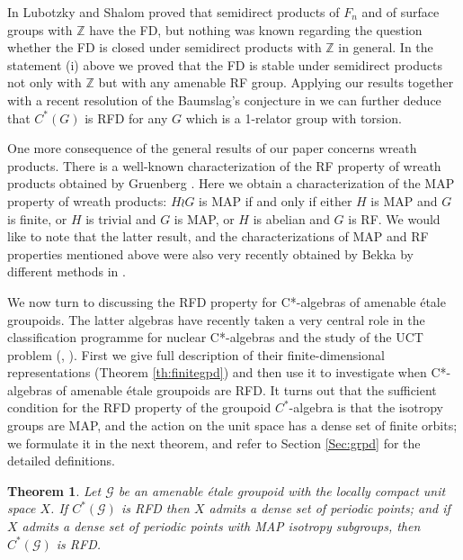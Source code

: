 \documentclass[11 pt, leqno, hidelinks]{amsart}%
\theoremstyle{plain}
\newtheorem{thmx}{Theorem}
\numberwithin{equation}{section}
\newcommand{\Z}{\mathbb{Z}}
\newcommand{\GG}{\mathcal{G}}
\begin{document}
In \cite[Th. 2.8]{LubotzkyShalom} Lubotzky and Shalom proved that semidirect products of $F_n$ and of surface groups with $\Z$ have the FD, but nothing was known regarding the question whether the FD is closed under semidirect products  with $\Z$ in general. In  the statement (i) above we proved that the FD is stable under   semidirect products  not only with $\Z$ but with any amenable RF group. Applying our results together with a recent resolution of the Baumslag's conjecture in \cite{KL} we can further deduce that $C^*(G)$ is RFD for any $G$ which is a 1-relator group with torsion.



One more  consequence  of the general results of our paper concerns wreath products. There is a well-known characterization of the RF property of wreath products  obtained by Gruenberg \cite{Grunberg}.
Here we obtain a characterization of the MAP property of wreath products:  $H \wr G$ is MAP if and only if either $H$ is MAP and $G$ is finite, or $H$ is trivial and $G$ is MAP,   or $H$ is abelian and $G$ is RF. We would like to note that the latter result, and  the characterizations of MAP and RF properties mentioned above  were also very recently obtained by Bekka by different methods in \cite{BekkaPreprint}.%

\medskip

We now turn to discussing the RFD property for C*-algebras of amenable \'etale groupoids.
The latter algebras have recently taken a very central role in the classification programme for nuclear C*-algebras and the study of the UCT problem (\cite{Re}, \cite{BaL}). First we give  full description of their finite-dimensional representations (Theorem \ref{th:finitegpd}) and then use it to investigate when C*-algebras of amenable \'etale groupoids are RFD.  It turns out that the sufficient condition for the RFD property of the groupoid $C^*$-algebra is that the isotropy groups are MAP, and the action on the unit space has a dense set of finite orbits; we formulate it in the next theorem, and refer to Section \ref{Sec:grpd} for the detailed definitions.

\begin{thmx} \label{thm:C}
	 Let $\GG$ be an amenable \'etale groupoid with the locally compact unit space $X$.
	If  $C^*(\GG)$ is RFD then $X$ admits a dense set of periodic points; and if $X$ admits a dense set of periodic points with MAP isotropy subgroups, then $C^*(\GG)$ is RFD.
\end{thmx}
\end{document}
